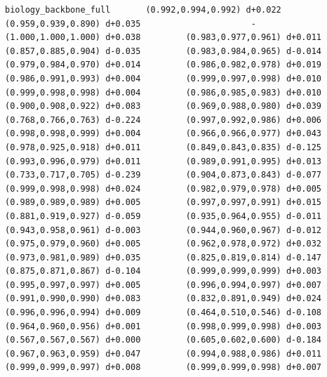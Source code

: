 \documentclass[11pt, letterpaper, openany]{book}
\begin{document}
\begin{empiricalbox}
\begin{lstlisting}[style=terminal]
biology_backbone_full       (0.992,0.994,0.992) d+0.022         (0.959,0.939,0.890) d+0.035                      -                      (1.000,1.000,1.000) d+0.038         (0.983,0.977,0.961) d+0.011         (0.857,0.885,0.904) d-0.035         (0.983,0.984,0.965) d-0.014         (0.979,0.984,0.970) d+0.014         (0.986,0.982,0.978) d+0.019         (0.986,0.991,0.993) d+0.004         (0.999,0.997,0.998) d+0.010         (0.999,0.998,0.998) d+0.004         (0.986,0.985,0.983) d+0.010         (0.900,0.908,0.922) d+0.083         (0.969,0.988,0.980) d+0.039         (0.768,0.766,0.763) d-0.224         (0.997,0.992,0.986) d+0.006         (0.998,0.998,0.999) d+0.004         (0.966,0.966,0.977) d+0.043         (0.978,0.925,0.918) d+0.011         (0.849,0.843,0.835) d-0.125         (0.993,0.996,0.979) d+0.011         (0.989,0.991,0.995) d+0.013         (0.733,0.717,0.705) d-0.239         (0.904,0.873,0.843) d-0.077         (0.999,0.998,0.998) d+0.024         (0.982,0.979,0.978) d+0.005         (0.989,0.989,0.989) d+0.005         (0.997,0.997,0.991) d+0.015         (0.881,0.919,0.927) d-0.059         (0.935,0.964,0.955) d-0.011         (0.943,0.958,0.961) d-0.003         (0.944,0.960,0.967) d-0.012         (0.975,0.979,0.960) d+0.005         (0.962,0.978,0.972) d+0.032         (0.973,0.981,0.989) d+0.035         (0.825,0.819,0.814) d-0.147         (0.875,0.871,0.867) d-0.104         (0.999,0.999,0.999) d+0.003         (0.995,0.997,0.997) d+0.005         (0.996,0.994,0.997) d+0.007         (0.991,0.990,0.990) d+0.083         (0.832,0.891,0.949) d+0.024         (0.996,0.996,0.994) d+0.009         (0.464,0.510,0.546) d-0.108         (0.964,0.960,0.956) d+0.001         (0.998,0.999,0.998) d+0.003         (0.567,0.567,0.567) d+0.000         (0.605,0.602,0.600) d-0.184         (0.967,0.963,0.959) d+0.047         (0.994,0.988,0.986) d+0.011         (0.999,0.999,0.997) d+0.008         (0.999,0.999,0.998) d+0.007     

\end{lstlisting}
\end{empiricalbox}
\end{document}
